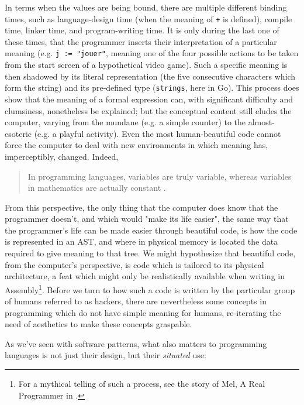 In terms when the values are being bound, there are multiple different binding times, such as language-design time (when the meaning of \lstinline{+} is defined), compile time, linker time, and program-writing time. It is only during the last one of these times, that the programmer inserts their interpretation of a particular meaning (e.g. \lstinline{j := "jouer"}, meaning one of the four possible actions to be taken from the start screen of a hypothetical video game). Such a specific meaning is then shadowed by its literal representation (the five consecutive characters which form the string) and its pre-defined type (\lstinline{strings}, here in Go). This process does show that the meaning of a formal expression can, with significant difficulty and clumsiness, nonetheless be explained; but the conceptual content still eludes the computer, varying from the mundane (e.g. a simple counter) to the almost-esoteric (e.g. a playful activity). Even the most human-beautiful code cannot force the computer to deal with new environments in which meaning has, imperceptibly, changed. Indeed,

\begin{quote}
  In programming languages, variables are truly variable, whereas variables in mathematics are actually constant \citep{wirth_essence_2003}.
\end{quote}

From this perspective, the only thing that the computer does know that the programmer doesn't, and which would "make its life easier", the same way that the programmer's life can be made easier through beautiful code, is how the code is represented in an AST, and where in physical memory is located the data required to give meaning to that tree\citep{stansifer_study_1994}. We might hypothesize that beautiful code, from the computer's perspective, is code which is tailored to its physical architecture, a feat which might only be realistically available when writing in Assembly\footnote{For a mythical telling of such a process, see the story of Mel, A Real Programmer in \citep{depaz_craft_2021}.}. Before we turn to how such a code is written by the particular group of humans referred to as hackers, there are nevertheless some concepts in programming which do not have simple meaning for humans, re-iterating the need of aesthetics to make these concepts graspable.

As we've seen with software patterns, what also matters to programming languages is not just their design, but their \emph{situated} use:

